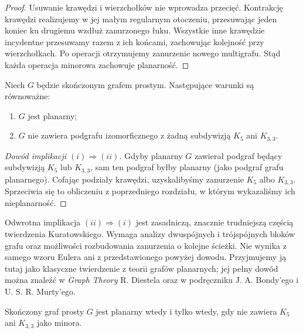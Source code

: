 \begin{proof}
Usuwanie krawędzi i wierzchołków nie wprowadza przecięć.
Kontrakcję krawędzi realizujemy w jej małym regularnym
otoczeniu, przesuwając jeden koniec ku drugiemu wzdłuż
zanurzonego łuku. Wszystkie inne krawędzie incydentne
przesuwamy razem z ich końcami, zachowując kolejność
przy wierzchołkach. Po operacji otrzymujemy zanurzenie
nowego multigrafu. Stąd każda operacja minorowa zachowuje planarność.
\end{proof}

\begin{twierdzenie}[Kuratowski]
\label{thm:tg-kuratowski}
Niech $G$ będzie skończonym grafem prostym. Następujące
warunki są równoważne:
\begin{enumerate}[label=(\roman*)]
\item $G$ jest planarny;
\item $G$ nie zawiera podgrafu izomorficznego z żadną
subdywizją $K_5$ ani $K_{3,3}$.
\end{enumerate}
\end{twierdzenie}

\begin{proof}[Dowód implikacji \texorpdfstring{$(i)\Rightarrow(ii)$}{(i) => (ii)}]
Gdyby planarny $G$ zawierał podgraf będący subdywizją
$K_5$ lub $K_{3,3}$, sam ten podgraf byłby planarny
(jako podgraf grafu planarnego). Cofając podziały krawędzi,
uzyskalibyśmy zanurzenie $K_5$ albo $K_{3,3}$.
Sprzeciwia się to obliczeniu z poprzedniego rozdziału,
w którym wykazaliśmy ich nieplanarność.
\end{proof}

\begin{uwaga}
Odwrotna implikacja $(ii)\Rightarrow(i)$ jest zasadniczą,
znacznie trudniejszą częścią twierdzenia Kuratowskiego.
Wymaga analizy dwuspójnych i trójspójnych bloków grafu
oraz możliwości rozbudowania zanurzenia o kolejne ścieżki.
Nie wynika z samego wzoru Eulera ani z przedstawionego
powyżej dowodu. Przyjmujemy ją tutaj jako klasyczne
twierdzenie z teorii grafów planarnych; jej pełny dowód
można znaleźć w \emph{Graph Theory} R. Diestela oraz
w podręczniku J. A. Bondy'ego i U. S. R. Murty'ego.
\end{uwaga}

\begin{twierdzenie}
\label{thm:tg-wagner}
Skończony graf prosty $G$ jest planarny wtedy i tylko wtedy,
gdy nie zawiera $K_5$ ani $K_{3,3}$ jako minora.
\end{twierdzenie}

